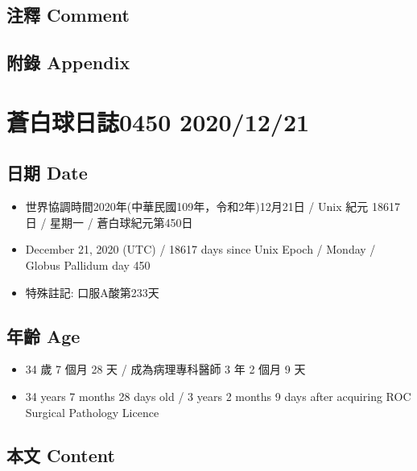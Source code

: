 \documentclass[a5paper, 11pt
]{book}
\providecommand{\tightlist}{%
  \setlength{\itemsep}{0pt}\setlength{\parskip}{0pt}}
\begin{document}
\hypertarget{ux6ce8ux91cb-comment-19}{%
\subsection{注釋 Comment}\label{ux6ce8ux91cb-comment-19}}

\hypertarget{ux9644ux9304-appendix-19}{%
\subsection{附錄 Appendix}\label{ux9644ux9304-appendix-19}}

\hypertarget{ux84bcux767dux7403ux65e5ux8a8c0450-20201221}{%
\section{蒼白球日誌0450
2020/12/21}\label{ux84bcux767dux7403ux65e5ux8a8c0450-20201221}}

\hypertarget{ux65e5ux671f-date-20}{%
\subsection{日期 Date}\label{ux65e5ux671f-date-20}}

\begin{itemize}
\tightlist
\item
  世界協調時間2020年(中華民國109年，令和2年)12月21日 / Unix 紀元 18617
  日 / 星期一 / 蒼白球紀元第450日
\item
  December 21, 2020 (UTC) / 18617 days since Unix Epoch / Monday /
  Globus Pallidum day 450
\item
  特殊註記: 口服A酸第233天
\end{itemize}

\hypertarget{ux5e74ux9f61-age-20}{%
\subsection{年齡 Age}\label{ux5e74ux9f61-age-20}}

\begin{itemize}
\tightlist
\item
  34 歲 7 個月 28 天 / 成為病理專科醫師 3 年 2 個月 9 天
\item
  34 years 7 months 28 days old / 3 years 2 months 9 days after
  acquiring ROC Surgical Pathology Licence
\end{itemize}

\hypertarget{ux672cux6587-content-20}{%
\subsection{本文 Content}\label{ux672cux6587-content-20}}
\end{document}

